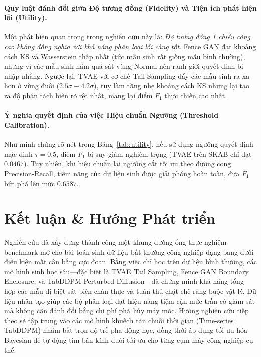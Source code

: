 \documentclass{article}
\begin{document}
\paragraph{Quy luật đánh đổi giữa Độ tương đồng (Fidelity) và Tiện ích phát hiện lỗi (Utility).} Một phát hiện quan trọng trong nghiên cứu này là: \emph{Độ tương đồng 1 chiều càng cao không đồng nghĩa với khả năng phân loại lỗi càng tốt}. Fence GAN đạt khoảng cách KS và Wasserstein thấp nhất (tức mẫu sinh rất giống mẫu bình thường), nhưng vì các mẫu sinh nằm quá sát vùng Normal nên ranh giới quyết định bị nhập nhằng. Ngược lại, TVAE với cơ chế Tail Sampling đẩy các mẫu sinh ra xa hơn ở vùng đuôi ($2.5\sigma - 4.2\sigma$), tuy làm tăng nhẹ khoảng cách KS nhưng lại tạo ra độ phân tách biên rõ rệt nhất, mang lại điểm $F_1$ thực chiến cao nhất.

\paragraph{Ý nghĩa quyết định của việc Hiệu chuẩn Ngưỡng (Threshold Calibration).} Như minh chứng rõ nét trong Bảng~\ref{tab:utility}, nếu sử dụng ngưỡng quyết định mặc định $\tau = 0.5$, điểm $F_1$ bị suy giảm nghiêm trọng (TVAE trên SKAB chỉ đạt $0.0467$). Tuy nhiên, khi hiệu chuẩn lại ngưỡng cắt tối ưu theo đường cong Precision-Recall, tiềm năng của dữ liệu sinh được giải phóng hoàn toàn, đưa $F_1$ bứt phá lên mức $0.6587$.

\section{Kết luận \& Hướng Phát triển}
\label{sec:conclusion}

Nghiên cứu đã xây dựng thành công một khung đường ống thực nghiệm benchmark mở cho bài toán sinh dữ liệu bất thường công nghiệp dạng bảng dưới điều kiện mất cân bằng cực đoan. Bằng việc chỉ học trên dữ liệu bình thường, các mô hình sinh học sâu---đặc biệt là TVAE Tail Sampling, Fence GAN Boundary Enclosure, và TabDDPM Perturbed Diffusion---đã chứng minh khả năng tổng hợp các mẫu dị biệt sát biên chân thực và tuân thủ chặt chẽ ràng buộc vật lý. Dữ liệu nhân tạo giúp các bộ phân loại đạt hiệu năng tiệm cận mức trần có giám sát mà không cần đánh đổi bằng chi phí phá hủy máy móc. Hướng nghiên cứu tiếp theo sẽ tập trung vào các mô hình khuếch tán chuỗi thời gian (Time-series TabDDPM) nhằm bắt trọn độ trễ pha động học, đồng thời áp dụng tối ưu hóa Bayesian để tự động tìm bán kính đuôi tối ưu cho từng cụm máy công nghiệp cụ thể.
\end{document}
